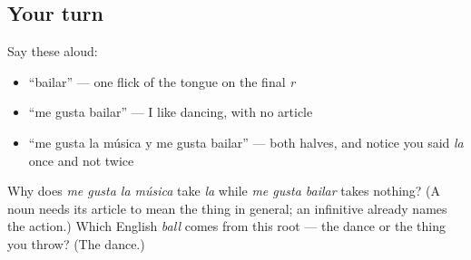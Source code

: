 \subsection*{Your turn}
Say these aloud:

\begin{itemize}
\raggedright
  \item \textquotedblleft{}bailar\textquotedblright{} — one flick of the tongue on the final \emph{r}
  \item \textquotedblleft{}me gusta bailar\textquotedblright{} — I like dancing, with no article
  \item \textquotedblleft{}me gusta la música y me gusta bailar\textquotedblright{} — both halves, and notice you said \emph{la} once and not twice
\end{itemize}

\begin{tcolorbox}[breakable,colback=teal!4,colframe=teal!35!black,title={Before you move on}]
Why does \emph{me gusta la música} take \emph{la} while \emph{me gusta bailar} takes nothing? (A noun needs its article to mean the thing in general; an infinitive already names the action.) Which English \emph{ball} comes from this root — the dance or the thing you throw? (The dance.)
\end{tcolorbox}
